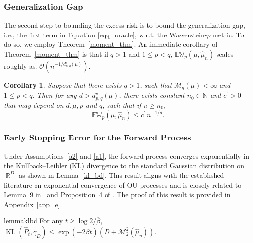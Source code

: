 \documentclass[12pts]{article}
\newtheorem{cor}[defn]{Corollary}%
\def\Real{\mathop{\mathbb{R}}\nolimits}
\newcommand{\cO}{ \mathcal{O}}
\newcommand{\sM}{ \mathscr{M}}
\newcommand{\hP}{ \hat{P}}
\newcommand{\hmu}{\hat{\mu}}
\newcommand{\E}{\mathbb{E}}
\newcommand{\fN}{\mathbb{N}}
\newcommand{\fW}{\mathbb{W}}
\newcommand{\kl}{\operatorname{KL}}
\begin{document}
\subsubsection{Generalization Gap}
The second step to bounding the excess risk is to bound the generalization gap, i.e., the first term in Equation \eqref{eqq_oracle}, w.r.t. the Wasserstein-$p$ metric.  To do so, we employ Theorem~\ref{moment_thm}. An immediate corollary of Theorem~\ref{moment_thm} is that if $q>1$ and $1 \le p < q$, $\E \fW_p(\mu, \hmu_n)$ scales roughly as, $\cO\left(n^{-1/d^\star_{p,q}(\mu)}\right)$. 
 \begin{cor}\label{cor4}
         Suppose that there exists  $q > 1$, such that $\sM_q(\mu) < \infty$ and $1 \le p < q$. Then for any $d > d^\star_{p, q}(\mu)$, there exists constant $n_0\in \fN$ and $c^\prime >0$ that may depend on $d, \mu, p$ and $q$, such that if $n \ge n_0$,
     \[\E \fW_p(\mu, \hmu_n) \le c^\prime \ n^{-1/d}.\]
 \end{cor}

 \subsubsection{Early Stopping Error for the Forward Process}
 Under Assumptions~\ref{a2} and \ref{a1}, the forward process converges exponentially in the Kullback--Leibler (KL) divergence to the standard Gaussian distribution on $\Real^D$ as shown in Lemma~\ref{kl_bd}. This result aligns with the established literature on exponential convergence of OU processes and is closely related to Lemma~9 in~\citep{chen2023improved} and Proposition~4 of \cite{benton2024nearly}. The proof of this result is provided in Appendix~\ref{app_e}.
  \begin{restatable}{lemma}{klbd}\label{kl_bd}
  For any $t \ge \log 2/ \overline{\beta}$, $\kl(\hP_t , \gamma_D) \le \exp\left(-2\underline{\beta}t\right) (D + \sM_2^2(\hmu_n))$.
\end{restatable}
\end{document}

